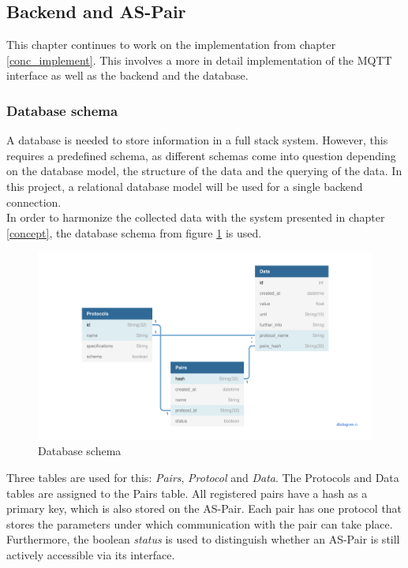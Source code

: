 \subsection{Backend and AS-Pair}\label{concept_BMC}

This chapter continues to work on the implementation from chapter \ref{conc_implement}. This involves a more in detail implementation of the MQTT interface as well as the backend and the database.

\subsubsection{Database schema}\label{database}

A database is needed to store information in a full stack system. However, this requires a predefined schema, as different schemas come into question depending on the database model, the structure of the data and the querying of the data. In this project, a relational database model will be used for a single backend connection.\\

In order to harmonize the collected data with the system presented in chapter \ref{concept}, the database schema from figure \ref{fig:database_schema} is used.\\

\begin{figure}[H]
    \centering
    \includegraphics[width=.65\textwidth]{images/4_2/database_schema.pdf}
    \caption{Database schema}
    \label{fig:database_schema}
\end{figure}

Three tables are used for this: \textit{Pairs}, \textit{Protocol} and \textit{Data}. The Protocols and Data tables are assigned to the Pairs table. All registered pairs have a hash as a primary key, which is also stored on the AS-Pair. Each pair has one protocol that stores the parameters under which communication with the pair can take place. Furthermore, the boolean \textit{status} is used to distinguish whether an AS-Pair is still actively accessible via its interface.\\

